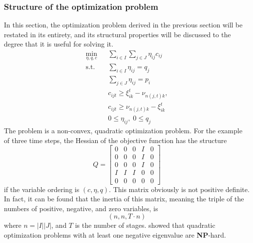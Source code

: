 \subsubsection{Structure of the optimization problem}
In this section, the optimization problem derived in the previous section will be restated in its entirety, and its structural properties will be discussed to the degree that it is useful for solving it.
\begin{subequations}
\begin{eqnarray}
  \label{eq:full-nlp-restated-objecive}
  \min_{\eta, q, c}&&  \sum_{i\in I}\sum_{j\in J} \eta_{ij} c_{ij}\\
  \label{eq:full-nlp-restated-q}
  \mathrm{s.t.}&&\sum_{i\in I}\eta_{ij} = q_j \\
  \label{eq:full-nlp-restated-p}
  &&\sum_{j\in J}\eta_{ij} = p_i\\
  \label{eq:full-nlp-restated-ineq1}
  &&c_{ijt} \geq \xi_{ik}^t - \nu_{n(j,t)k},\\
  \label{eq:full-nlp-restated-ineq2}
  &&c_{ijt} \geq \nu_{n(j,t)k} - \xi_{ik}^t\\
  &&0 \leq \eta_{ij},\; 0\leq q_j
\end{eqnarray}
\end{subequations}
The problem is a non-convex, quadratic optimization problem. For the example of three time steps, the Hessian of the objective function has the structure
\begin{equation}
  \label{eq:structure-of-quadratic-hessian}
  Q = \left[\begin{array}{ccccc}
      0&0&0&I&0\\0&0&0&I&0\\0&0&0&I&0\\I&I&I&0&0\\0&0&0&0&0
    \end{array}\right]
\end{equation}
if the variable ordering is $(c,\eta, q)$. This matrix obviously is not positive definite. In fact, it can be found that the inertia of this matrix, meaning the triple of the numbers of positive, negative, and zero variables, is
\begin{equation}
  \label{eq:inertia-of-hessian}
  \left(n, n, T\cdot n\right)
\end{equation}
where $n=|I||J|$, and $T$ is the number of stages.
\citet{Pardalos1991} showed that quadratic optimization problems with at least one negative eigenvalue are \textbf{NP}-hard.
